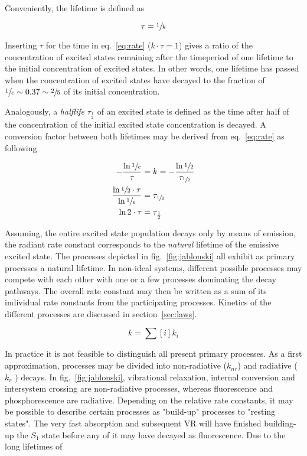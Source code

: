 		Conveniently, the lifetime is defined as 

		\begin{equation}
		\label{eq:tau}
			\tau = \sfrac{1}{k}
		\end{equation}

		Inserting $\tau$ for the time in eq.~\ref{eq:rate} ($k\cdot\tau = 1$) gives a ratio of the concentration of excited states remaining after the timeperiod of one lifetime to the initial concentration of excited states. In other words, one lifetime has passed when the concentration of excited states have decayed to the fraction of $\sfrac{1}{e} \sim 0.37 \sim \sfrac{2}{5}$ of its initial concentration. 

		Analogously, a \emph{halflife} $\tau_{\frac{1}{2}}$ of an excited state is defined as the time after half of the concentration of the initial excited state concentration is decayed. A conversion factor between both lifetimes may be derived from eq.~\ref{eq:rate} as following 

		\begin{equation}
			\begin{split}
				-\frac{\ln \sfrac{1}{e} }{\tau} &= k = -\frac{\ln\sfrac{1}{2}}{\tau_{\sfrac{1}{2}}} \\
				\frac{\ln\sfrac{1}{2} \cdot \tau}{\ln\sfrac{1}{e}} &= \tau_{\sfrac{1}{2}} \\
				\ln2\cdot\tau &= \tau_{\frac{1}{2}}
			\end{split}
		\end{equation}


		Assuming, the entire excited state population decays only by means of emission, the radiant rate constant corresponds to the \emph{natural} lifetime of the emissive excited state. The processes depicted in fig.~\ref{fig:jablonski} all exhibit as primary processes a natural lifetime. In non-ideal systems, different possible processes may compete with each other with one or a few processes dominating the decay pathways. The  overall rate constant may then be written as a sum of its individual rate constants from the participating processes. Kinetics of the different processes are discussed in section~\ref{sec:laws}. 

		\begin{equation}
			k = \sum[i]k_i
		\end{equation}

		In practice it is not feasible to distinguish all present primary processes. As a first approximation, processes may be divided into non-radiative ($ k_{nr} $) and radiative ( $ k_{r}$ ) decays. In fig.~\ref{fig:jablonski}, vibrational relaxation, internal conversion and intersystem crossing are non-radiative processes, whereas fluorescence and phosphorescence are radiative. Depending on the relative rate constants, it may be possible to describe certain processes as "build-up" processes to "resting states". The very fast absorption and subsequent VR will have finished building-up the $S_1$ state before any of it may have decayed as fluorescence. Due to the long lifetimes of  %

